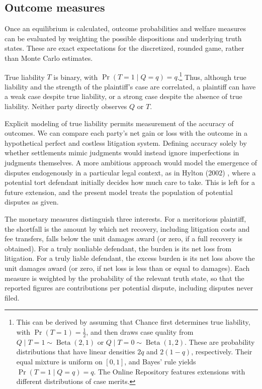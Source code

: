 \documentclass{article}
\begin{document}
\subsection{Outcome measures}
\label{sec:outcome-measures}

Once an equilibrium is calculated, outcome probabilities and welfare measures can be evaluated by weighting the possible dispositions and underlying truth states. These are exact expectations for the discretized, rounded game, rather than Monte Carlo estimates. 

True liability $T$ is binary, with $\Pr(T=1\mid Q=q)=q$.\footnote{This can be derived by assuming that Chance first determines true liability, with $\Pr(T=1)=\frac{1}{2}$, and then draws case quality from $Q\mid T=1\sim\operatorname{Beta}(2,1)$ or $Q\mid T=0\sim\operatorname{Beta}(1,2)$. These are probability distributions that have linear densities $2q$ and $2(1-q)$, respectively. Their equal mixture is uniform on $[0,1]$, and Bayes' rule yields $\Pr(T=1\mid Q=q)=q$. The Online Repository features extensions with different distributions of case merits.} 
Thus, although true liability and the strength of the plaintiff's case are correlated, a plaintiff can have a weak case despite true liability, or a strong case despite the absence of true liability. Neither party directly observes $Q$ or $T$.


Explicit modeling of true liability permits measurement of the accuracy of outcomes. We can compare each party's net gain or loss with the outcome in a hypothetical perfect and costless litigation system. Defining accuracy solely by whether settlements mimic judgments would instead ignore imperfections in judgments themselves. A more ambitious approach would model the emergence of disputes endogenously in a particular legal context, as in Hylton (2002) \cite{hylton}, where a potential tort defendant initially decides how much care to take. This is left for a future extension, and the present model treats the population of potential disputes as given.

The monetary measures distinguish three interests. For a meritorious plaintiff, the shortfall is the amount by which net recovery, including litigation costs and fee transfers, falls below the unit damages award (or zero, if a full recovery is obtained). For a truly nonliable defendant, the burden is its net loss from litigation. For a truly liable defendant, the excess burden is its net loss above the unit damages award (or zero, if net loss is less than or equal to damages). Each measure is weighted by the probability of the relevant truth state, so that the reported figures are contributions per potential dispute, including disputes never filed.
\end{document}

